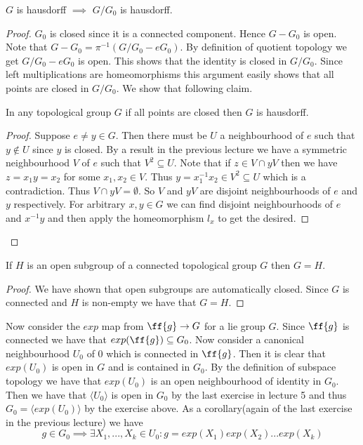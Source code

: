 \documentclass{article}
\begin{document}
\begin{exercise*}
    $G$ is hausdorff $\implies$ $G/G_0$ is hausdorff.
\end{exercise*}
\begin{proof}
    $G_0$ is closed since it is a connected component. Hence $G-G_0$ is open. Note that $G-G_0 = \pi^{-1}(G/G_0-eG_0)$. By definition of quotient topology we get $G/G_0-eG_0$ is open.
    This shows that the identity is closed in $G/G_0$. Since left multiplications are homeomorphisms this argument easily shows that all points are closed in $G/G_0$.
    We show that following claim.
    \begin{claim*}
        In any topological group $G$ if all points are closed then $G$ is hausdorff.
    \end{claim*}
    \begin{proof}
        Suppose $e\neq y\in G$. Then there must be $U$ a neighbourhood of $e$ such that $y\notin U$ since $y$ is closed. By a result in the previous lecture we have a symmetric neighbourhood $V$ of $e$ such that $V^2\subseteq U$. 
        Note that if $z\in V\cap yV$ then we have $z = x_1y = x_2$ for some $x_1,x_2\in V$. Thus $y = x_1^{-1}x_2\in V^2\subseteq U$ which is a contradiction. Thus $V\cap yV = \emptyset$.
        So $V$ and $yV$ are disjoint neighbourhoods of $e$ and $y$ respectively. For arbitrary $x,y\in G$ we can find disjoint neighbourhoods of $e$ and $x^{-1}y$ and then apply the homeomorphism $l_x$ to get the desired.
    \end{proof}
\end{proof}

\begin{exercise*}
    If $H$ is an open subgroup of a connected topological group $G$ then $G=H$.
\end{exercise*}
\begin{proof}
    We have shown that open subgroups are automatically closed. Since $G$ is connected and $H$ is non-empty we have that $G=H$.
\end{proof}

Now consider the $exp$ map from $\ff{g}\to G$ for a lie group $G$. Since $\ff{g}$ is connected we have that $exp(\ff{g})\subseteq G_0$. Now consider a canonical neighbourhood $U_0$ of $0$ which is connected in $\ff{g}$. Then it is clear that $exp(U_0)$ is open in $G$ and is contained in $G_0$.
By the definition of subspace topology we have that $exp(U_0)$ is an open neighbourhood of identity in $G_0$. Then we have that $\langle U_0\rangle$ is open in $G_0$ by the last exercise in lecture 5 and thus $G_0 = \langle exp(U_0)\rangle$ by the exercise above. As a corollary(again of the last exercise in the previous lecture)
we have $$g\in G_0\implies\exists X_1,...,X_k\in U_0: g = exp(X_1)exp(X_2)...exp(X_k)$$
\end{document}
